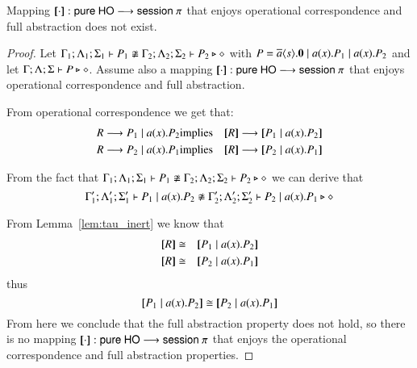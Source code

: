\begin{theorem}
	Mapping $[\!\![\cdot]\!\!]: \mathsf{pure\ HO} \longrightarrow \mathsf{session\ }\pi$ that enjoys
	operational correspondence and full abstraction does not exist. 
\end{theorem}

\begin{proof}
	Let $\Gamma_1; \Lambda_1; \Sigma_1 \vdash P_1 \not\cong \Gamma_2; \Lambda_2; \Sigma_2 \vdash P_2 \triangleright \diamond$
	with $P = \overline{a} \langle s \rangle . \mathbf{0} \;|\; a (x) . P_1 \;|\; a (x) . P_2$ and
	let $\Gamma; \Lambda; \Sigma \vdash P \triangleright \diamond$. Assume also a mapping
	$[\!\![\cdot]\!\!]: \mathsf{pure\ HO} \longrightarrow \mathsf{session\ }\pi$ that enjoys
	operational correspondence and full abstraction.

	From operational correspondence we get that:
	\begin{eqnarray*}
		R \red P_1 \Par \bacc{a}{x} P_2 &\textrm{implies}& \map{R} \red \map{P_1 \Par \bacc{a}{x} P_2}\\
		R \red P_2 \Par \bacc{a}{x} P_1 &\textrm{implies}& \map{R} \red \map{P_2 \Par \bacc{a}{x} P_1}
	\end{eqnarray*}

	From the fact that
	$\Gamma_1; \Lambda_1; \Sigma_1 \vdash P_1 \not\cong \Gamma_2; \Lambda_2; \Sigma_2 \vdash P_2 \triangleright \diamond$
	we can derive that
	\[
		\Gamma_1'; \Lambda_1'; \Sigma_1' \vdash P_1 \;|\; a (x) . P_2 \not\cong \Gamma_2'; \Lambda_2'; \Sigma_2' \vdash P_2 \;|\; a (x) . P_1 \triangleright \diamond
	\]

	From Lemma~\ref{lem:tau_inert} we know that
	\begin{eqnarray*}
		\map{R} &\cong& \map{P_1 \Par \bacc{a}{x} P_2}\\
		\map{R} &\cong& \map{P_2 \Par \bacc{a}{x} P_1}
	\end{eqnarray*}
	\noi thus
	\[
		\map{P_1 \Par \bacc{a}{x} P_2} \cong \map{P_2 \Par \bacc{a}{x} P_1}
	\]
	From here we conclude that the full abstraction property does not hold,
	so there is no mapping $[\!\![\cdot]\!\!]: \mathsf{pure\ HO} \longrightarrow \mathsf{session\ }\pi$ that enjoys
	the operational correspondence and full abstraction properties.
\end{proof}


